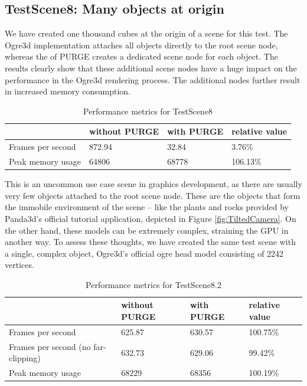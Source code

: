 	\subsection{TestScene8: Many objects at origin}

		We have created one thousand cubes at the origin of a scene for this test. The Ogre3d implementation attaches all objects directly to the root scene node, whereas the  of PURGE creates a dedicated scene node for each object. The results clearly show that these additional scene nodes have a huge impact on the performance in the Ogre3d rendering process. The additional nodes further result in increased memory consumption.

		\begin{table}[htpb]
			\center
			\caption{Performance metrics for TestScene8}
			\begin{tabular}{l | l | l | l}
				& without PURGE & with PURGE & relative value\\ \hline
				Frames per second & 872.94 & 32.84 & 3.76\%\\
				Peak memory usage & 64806 & 68778 & 106.13\%\\
			\end{tabular}
			\label{tbl:Performance8}
		\end{table}

		This is an uncommon use case scene in graphics development, as there are usually very few objects attached to the root scene node. These are the objects that form the immobile environment of the scene -- like the plants and rocks provided by Panda3d's official tutorial application, depicted in Figure \ref{fig:TiltedCamera}. On the other hand, these models can be extremely complex, straining the GPU in another way. To assess these thoughts, we have created the same test scene with a single, complex object, Ogre3d's official ogre head model consisting of 2242 vertices.
		
		\begin{table}[htpb]
			\center
			\caption{Performance metrics for TestScene8.2}
			\begin{tabular}{l | l | l | l}
				& without PURGE & with PURGE & relative value\\ \hline
				Frames per second & 625.87 & 630.57 & 100.75\%\\
				Frames per second (no far-clipping) & 632.73 & 629.06 & 99.42\%\\
				Peak memory usage & 68229 & 68356 & 100.19\%\\
			\end{tabular}
			\label{tbl:Performance8.2}
		\end{table}

